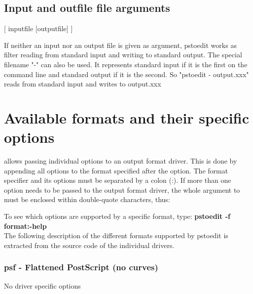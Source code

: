\documentclass[english,a4paper]{article}
\begin{document}
\begin{description}
\item[]



\item[]



\item[]



\item[]



\end{description}
\subsection{Input and outfile file arguments}
[ inputfile [outputfile] ]


If neither an input nor an output file is given as argument, pstoedit works as filter reading from standard input and
writing to standard output.
The special filename "-" can also be used. It represents standard input if it is the first on the command line and standard output if it is the second. So "pstoedit - output.xxx" reads from standard input and writes to output.xxx


\section{Available formats and their specific options}

 allows passing individual options to an output format driver. This is done by
appending all options to the format specified after the  option. The format
specifier and its options must be separated by a colon (:). If more than one
option needs to be passed to the output format driver, the whole argument to  must be
enclosed within double-quote characters, thus:


To see which options are supported by a specific format, type:
     \textbf{pstoedit -f format:-help}
     \\

The following description of the different formats supported by pstoedit is extracted from the source code of the individual drivers.

\subsubsection{psf - Flattened PostScript (no curves)}
No driver specific options
\end{document}

